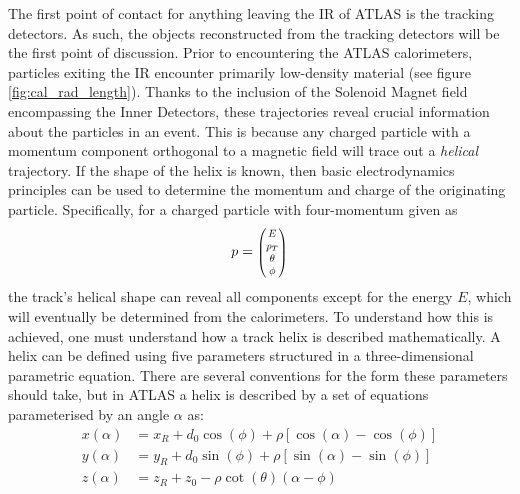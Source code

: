             The first point of contact for anything leaving the IR of ATLAS is the tracking detectors.
            As such, the objects reconstructed from the tracking detectors will be the first point of discussion.
            Prior to encountering the ATLAS calorimeters,
                particles exiting the IR encounter primarily low-density material (see figure \ref{fig:cal_rad_length}).
            Thanks to the inclusion of the Solenoid Magnet field encompassing the Inner Detectors,
                these trajectories reveal crucial information about the particles in an event.
            This is because any charged particle with a momentum component orthogonal to a magnetic field
                will trace out a \textit{helical} trajectory.
            If the shape of the helix is known, then basic electrodynamics principles can be used to determine the
                momentum and charge of the originating particle.
            Specifically, for a charged particle with four-momentum given as 
            \begin{equation}
            p = \minimatrix{E \\ p_T \\ \theta \\ \phi}
            \end{equation}
            the track's helical shape can reveal all components except for the energy $E$,
                which will eventually be determined from the calorimeters.
            To understand how this is achieved, one must understand how a track helix is described mathematically.
            A helix can be defined using five parameters structured in a three-dimensional parametric equation.
            There are several conventions for the form these parameters should take,
                but in ATLAS a helix is described by a set of equations parameterised by an angle $\alpha$ as\cite{thesis_giacinto}:
            \begin{equation} \begin{split}
            x(\alpha) &= x_R + d_0 \cos(\phi) + \rho \left[ \cos(\alpha) - \cos(\phi) \right] \\
            y(\alpha) &= y_R + d_0 \sin(\phi) + \rho \left[ \sin(\alpha) - \sin(\phi) \right] \\
            z(\alpha) &= z_R + z_0 - \rho \cot(\theta) (\alpha - \phi)
            \end{split} \end{equation}

